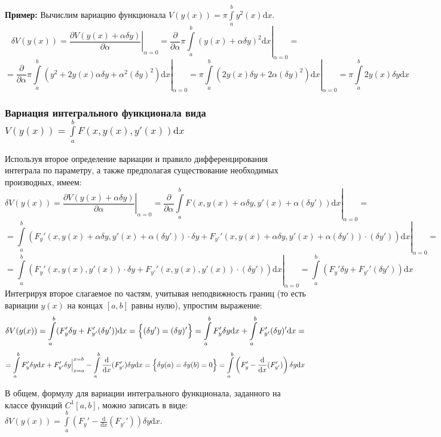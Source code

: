 \documentclass[12pt, a4paper]{article}
\newcommand{\di}{\mathrm{d}}
\begin{document}
\textbf{Пример:} Вычислим вариацию функционала $V(y(x)) = \pi \int \limits_a^b y^2(x) \di x$.
\[\delta V(y(x)) = \left. \frac{\partial V(y(x) + \alpha \delta y)}{\partial \alpha} \right|_{\alpha = 0} = \left. \frac{\partial}{\partial \alpha} \pi \int \limits_a^b (y(x) + \alpha \delta y)^2 \di x \right|_{\alpha = 0} = \]
\[= \left. \frac{\partial}{\partial \alpha} \pi \int \limits_a^b (y^2 + 2y(x)\alpha \delta y + \alpha^2 (\delta y)^2) \di x \right|_{\alpha = 0} = \left. \pi \int \limits_a^b (2y(x) \delta y + 2\alpha (\delta y)^2) \di x \right|_{\alpha = 0} = \pi \int \limits_a^b 2y(x) \delta y \di x \]

\subsubsection[Вариация интегрального функционала вида $\int \limits_a^b F(x, y(x), y'(x)) \di x$]{Вариация интегрального функционала вида $V(y(x)) = \int \limits_a^b F(x, y(x), y'(x)) \di x$}

Используя второе определение вариации и правило дифференцирования интеграла по параметру, а также предполагая существование необходимых производных, имеем:
\[\left. \delta V(y(x)) = \frac{\partial V(y(x) + \alpha \delta y)}{\partial \alpha} \right|_{\alpha = 0} = \left. \frac{\partial}{\partial \alpha} \int \limits_a^b F(x, y(x) + \alpha \delta y, y'(x) + \alpha (\delta y')) \di x \right|_{\alpha = 0} = \]
\[= \left. \int \limits_a^b \left( F_y'(x, y(x) + \alpha \delta y, y'(x) + \alpha (\delta y')) \cdot \delta y + F_{y'}'(x, y(x) + \alpha \delta y, y'(x) + \alpha (\delta y')) \cdot (\delta y') \right) \di x \right|_{\alpha = 0} = \]
\[= \left. \int \limits_a^b \left( F_y'(x, y(x), y'(x)) \cdot \delta y + F_{y'}' (x, y(x), y'(x)) \cdot (\delta y') \right) \di x \right|_{\alpha = 0} = \int \limits_a^b (F_y' \delta y + F_{y'}' (\delta y')) \di x \]
Интегрируя второе слагаемое по частям, учитывая неподвижность границ (то есть вариации $y(x)$ на концах $[a, b]$ равны нулю), упростим выражение:
\[\delta V(y(x)) = \int \limits_a^b (F_y' \delta y + F_{y'}' (\delta y')) \di x = \Bigl\{ (\delta y') = (\delta y)' \Bigr\} = \int \limits_a^b F_y' \delta y \di x + \int \limits_a^b F_{y'}' (\delta y)' \di x = \]
\[= \int \limits_a^b F_y' \delta y \di x + \Bigl. F_{y'}' \delta y \Bigr|_{x=a}^{x=b} - \int \limits_a^b \frac{\di}{\di x} (F_{y'}') \delta y \di x = \Bigl\{ \delta y(a) = \delta y(b) = 0 \Bigr\} = \int \limits_a^b \left( F_y' - \frac{\di}{\di x} (F_{y'}') \right) \delta y \di x \]

В общем, формулу для вариации интегрального функционала, заданного на классе функций $C^1[a, b]$, можно записать в виде: $\delta V(y(x)) = \int \limits_a^b \left( F_y' - \frac{\di}{\di x} (F_{y'}') \right) \delta y \di x$.
\end{document}
